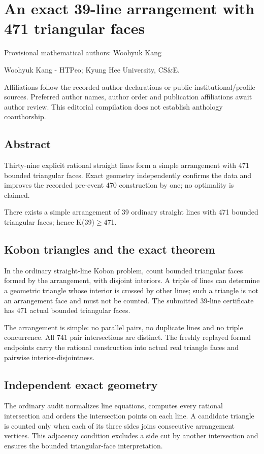 \documentclass[11pt,a4paper]{article}
\begin{document}
\section{An exact 39-line arrangement with 471 triangular faces}
{\small Provisional mathematical authors: Woohyuk Kang\par}\medskip
{\small Woohyuk Kang  -  HTPeo; Kyung Hee University, CS\&E.\par}

{\small Affiliations follow the recorded author declarations or public institutional/profile sources. Preferred author names, author order and publication affiliations await author review. This editorial compilation does not establish anthology coauthorship.\par}

\subsection{Abstract}
Thirty-nine explicit rational straight lines form a simple arrangement with 471 bounded triangular faces. Exact geometry independently confirms the data and improves the recorded pre-event 470 construction by one; no optimality is claimed.

There exists a simple arrangement of 39 ordinary straight lines with 471 bounded triangular faces; hence K(39)\ensuremath{\geq}471.

\subsection{Kobon triangles and the exact theorem}
In the ordinary straight-line Kobon problem, count bounded triangular faces formed by the arrangement, with disjoint interiors. A triple of lines can determine a geometric triangle whose interior is crossed by other lines; such a triangle is not an arrangement face and must not be counted. The submitted 39-line certificate has 471 actual bounded triangular faces.

The arrangement is simple: no parallel pairs, no duplicate lines and no triple concurrence. All 741 pair intersections are distinct. The freshly replayed formal endpoints carry the rational construction into actual real triangle faces and pairwise interior-disjointness.

\subsection{Independent exact geometry}
The ordinary audit normalizes line equations, computes every rational intersection and orders the intersection points on each line. A candidate triangle is counted only when each of its three sides joins consecutive arrangement vertices. This adjacency condition excludes a side cut by another intersection and ensures the bounded triangular-face interpretation.
\end{document}
